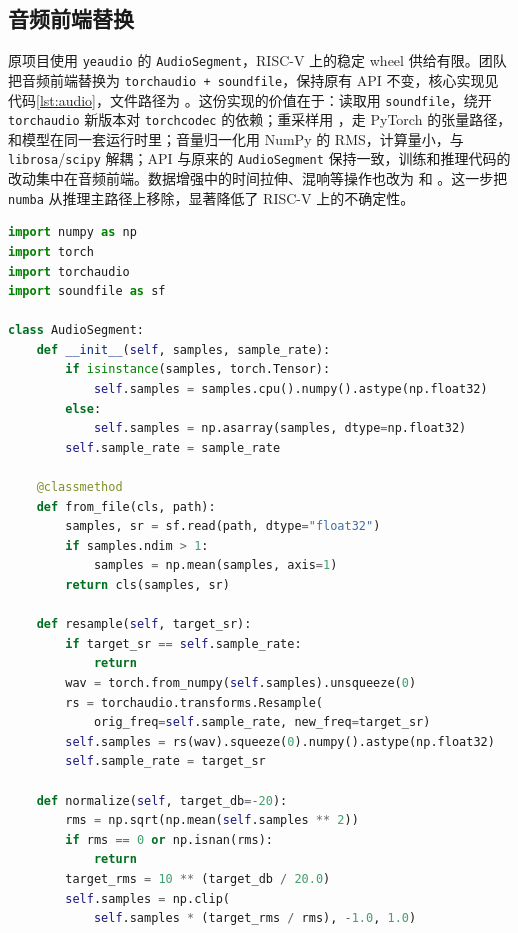 \documentclass[UTF8,11pt,a4paper,fontset=none]{ctexart}
\begin{document}
\subsection{音频前端替换}

原项目使用 \texttt{yeaudio} 的 \texttt{AudioSegment}，RISC-V 上的稳定 wheel 供给有限。团队把音频前端替换为 \texttt{torchaudio + soundfile}，保持原有 API 不变，核心实现见代码\ref{lst:audio}，文件路径为 。这份实现的价值在于：读取用 \texttt{soundfile}，绕开 \texttt{torchaudio} 新版本对 \texttt{torchcodec} 的依赖；重采样用 ，走 PyTorch 的张量路径，和模型在同一套运行时里；音量归一化用 NumPy 的 RMS，计算量小，与 \texttt{librosa}/\texttt{scipy} 解耦；API 与原来的 \texttt{AudioSegment} 保持一致，训练和推理代码的改动集中在音频前端。数据增强中的时间拉伸、混响等操作也改为  和 。这一步把 \texttt{numba} 从推理主路径上移除，显著降低了 RISC-V 上的不确定性。

\begin{lstlisting}[language=Python,caption={RISC-V 友好的 \texttt{AudioSegment} 实现（节选）},label={lst:audio}]
import numpy as np
import torch
import torchaudio
import soundfile as sf

class AudioSegment:
    def __init__(self, samples, sample_rate):
        if isinstance(samples, torch.Tensor):
            self.samples = samples.cpu().numpy().astype(np.float32)
        else:
            self.samples = np.asarray(samples, dtype=np.float32)
        self.sample_rate = sample_rate

    @classmethod
    def from_file(cls, path):
        samples, sr = sf.read(path, dtype="float32")
        if samples.ndim > 1:
            samples = np.mean(samples, axis=1)
        return cls(samples, sr)

    def resample(self, target_sr):
        if target_sr == self.sample_rate:
            return
        wav = torch.from_numpy(self.samples).unsqueeze(0)
        rs = torchaudio.transforms.Resample(
            orig_freq=self.sample_rate, new_freq=target_sr)
        self.samples = rs(wav).squeeze(0).numpy().astype(np.float32)
        self.sample_rate = target_sr

    def normalize(self, target_db=-20):
        rms = np.sqrt(np.mean(self.samples ** 2))
        if rms == 0 or np.isnan(rms):
            return
        target_rms = 10 ** (target_db / 20.0)
        self.samples = np.clip(
            self.samples * (target_rms / rms), -1.0, 1.0)
\end{lstlisting}
\end{document}
